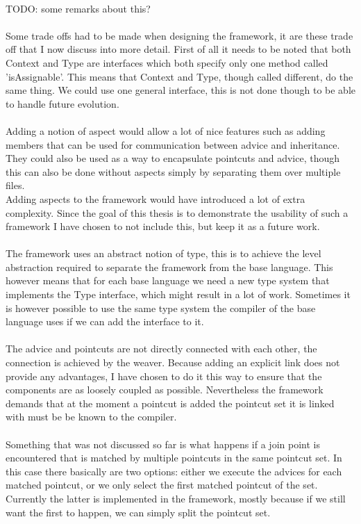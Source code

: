 \documentclass[a4paper]{report}
\begin{document}
\\
TODO: some remarks about this?\\
\\
Some trade offs had to be made when designing the framework, it are these trade off that I now discuss into more detail. First of all it needs to be noted that both Context and Type are interfaces which both specify only one method called 'isAssignable'. This means that Context and Type, though called different, do the same thing. We could use one general interface, this is not done though to be able to handle future evolution.\\
\\
Adding a notion of aspect would allow a lot of nice features such as adding members that can be used for communication between advice and inheritance. They could also be used as a way to encapsulate pointcuts and advice, though this can also be done without aspects simply by separating them over multiple files.\\
Adding aspects to the framework would have introduced a lot of extra complexity. Since the goal of this thesis is to demonstrate the usability of such a framework I have chosen to not include this, but keep it as a future work.\\
\\
The framework uses an abstract notion of type, this is to achieve the level abstraction required to separate the framework from the base language. This however means that for each base language we need a new type system that implements the Type interface, which might result in a lot of work. Sometimes it is however possible to use the same type system the compiler of the base language uses if we can add the interface to it.\\
\\
The advice and pointcuts are not directly connected with each other, the connection is achieved by the weaver. Because adding an explicit link does not provide any advantages, I have chosen to do it this way to ensure that the components are as loosely coupled as possible. Nevertheless the framework demands that at the moment a pointcut is added the pointcut set it is linked with must be be known to the compiler.\\
\\
Something that was not discussed so far is what happens if a join point is encountered that is matched by multiple pointcuts in the same pointcut set. In this case there basically are two options: either we execute the advices for each matched pointcut, or we only select the first matched pointcut of the set. Currently the latter is implemented in the framework, mostly because if we still want the first to happen, we can simply split the pointcut set.\\
\end{document}

